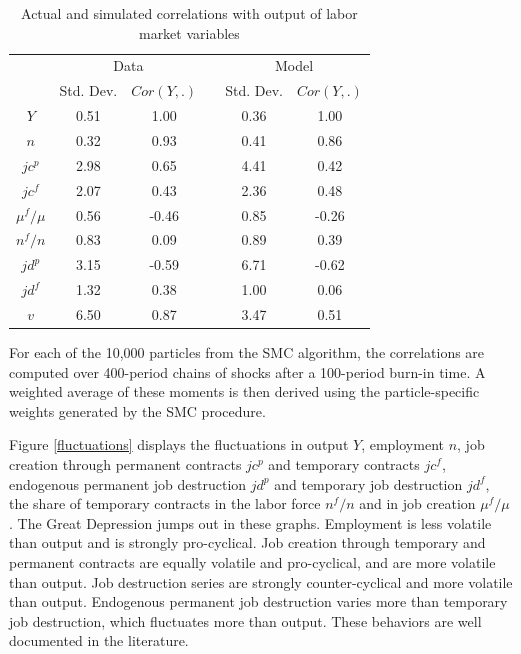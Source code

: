 \documentclass[a4paper]{article}
\begin{document}
\begin{table}[t]
  \centering
  \caption{Actual and simulated correlations with output of labor market variables}
	\begin{tabular}{cccccc}
	\toprule
    \toprule
          & \multicolumn{2}{c}{Data} &       & \multicolumn{2}{c}{Model} \\
    	\cmidrule{2-3} \cmidrule{5-6}
          & Std. Dev. & $Cor(Y,.)$ &       & Std. Dev. & $Cor(Y,.)$ \\
    \midrule
    $Y$   & 0.51  & 1.00  &       & 0.36  & 1.00 \\
    $n$   & 0.32  & 0.93  &       & 0.41  & 0.86 \\
    $jc^p$ & 2.98  & 0.65  &       & 4.41  & 0.42 \\
    $jc^f$ & 2.07  & 0.43  &       & 2.36  & 0.48 \\
    $\mu^f / \mu$ & 0.56  & -0.46 &       & 0.85  & -0.26 \\
    $n^f / n$ & 0.83  & 0.09  &       & 0.89  & 0.39 \\
    $jd^p$ & 3.15  & -0.59 &       & 6.71  & -0.62 \\
    $jd^f$ & 1.32  & 0.38  &       & 1.00  & 0.06 \\
    $v$   & 6.50  & 0.87  &       & 3.47  & 0.51 \\
    \bottomrule
    \end{tabular}%
  \label{corr}%
  \begin{flushleft}
  \footnotesize{For each of the 10,000 particles from the SMC algorithm, the correlations are computed over 400-period chains of shocks after a 100-period burn-in time. A weighted average of these moments is then derived using the particle-specific weights generated by the SMC procedure.}
  \end{flushleft}
\end{table}%

Figure \ref{fluctuations} displays the fluctuations in output $Y$, employment $n$, job creation through permanent contracts $jc^p$ and temporary contracts $jc^f$, endogenous permanent job destruction $jd^p$ and temporary job destruction $jd^f$, the share of temporary contracts in the labor force $n^f / n$ and in job creation $\mu^f / \mu$. The Great Depression jumps out in these graphs. Employment is less volatile than output and is strongly pro-cyclical. Job creation through temporary and permanent contracts are equally volatile and pro-cyclical, and are more volatile than output. Job destruction series are strongly counter-cyclical and more volatile than output. Endogenous permanent job destruction varies more than temporary job destruction, which fluctuates more than output. These behaviors are well documented in the literature. 
\end{document}

